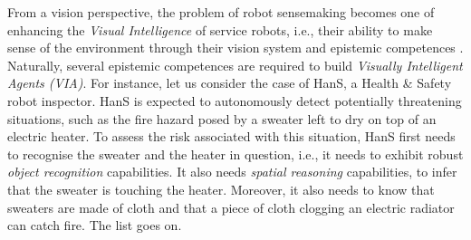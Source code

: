 \documentclass{article}
\begin{document}
From a vision perspective, the problem of robot sensemaking becomes one of enhancing the \textit{Visual Intelligence} of service robots, i.e., their ability to make sense of the environment through their vision system and epistemic competences \cite{chiatti_towards_2020}. 
Naturally, several epistemic competences are required to build \textit{Visually Intelligent Agents (VIA)}. For instance, let us consider the case of HanS, a Health \& Safety robot inspector. HanS is expected to autonomously detect potentially threatening situations, such as the fire hazard posed by a sweater left to dry on top of an electric heater. To assess the risk associated with this situation, HanS first needs to recognise the sweater and the heater in question, i.e., it needs to exhibit robust \textit{object recognition} capabilities. It also needs \textit{spatial reasoning} capabilities, to infer that the sweater is touching the heater. Moreover, it also needs to know that sweaters are made of cloth and that a piece of cloth clogging an electric radiator can catch fire. The list goes on. 
\end{document}
